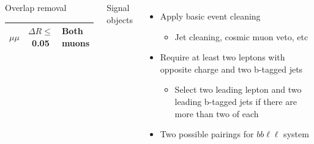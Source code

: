 \documentclass[10pt, svgnames]{beamer}
\begin{document}
\begin{frame}
\begin{columns}
\begin{block}{Overlap removal}
{\begin{tabular}{lcl}
          $\mu\mu$  & $\Delta R \le$ 0.05 & Both muons             \\
          \bottomrule
        \end{tabular}
      }
    \end{block}
    \begin{block}{Signal objects}
      \vspace{1ex}
    \end{block}
    \begin{itemize}
      \item Apply basic event cleaning
        \begin{itemize}
          \item Jet cleaning, cosmic muon veto, etc
        \end{itemize}
      \item Require at least two leptons with opposite charge and two
        b-tagged jets
        \begin{itemize}
          \item Select two leading lepton and two leading b-tagged jets if
            there are more than two of each
        \end{itemize}
      \item Two possible pairings for $bb\ell\ell$ system
        \begin{center}
\end{center}
\end{itemize}
\end{columns}
\end{frame}
\end{document}
